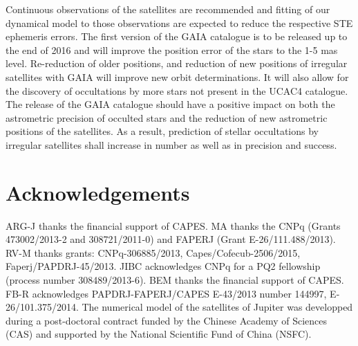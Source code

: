 \documentclass[useAMS,usenatbib]{mn2e}
\begin{document}
Continuous observations of the satellites are recommended and fitting of our dynamical model to those observations are expected to reduce the respective STE ephemeris errors. The first version of the GAIA catalogue is to be released up to the end of 2016 and will improve the position error of the stars to the 1-5 mas level. Re-reduction of older positions, and reduction of new positions of irregular satellites with GAIA will improve new orbit determinations. It will also allow for the discovery of occultations by more stars not present in the UCAC4 catalogue.
The release of the GAIA catalogue should have a positive impact on both the astrometric precision of occulted stars and the reduction of new astrometric positions of the satellites. As a result, prediction of stellar occultations by irregular satellites shall increase in number as well as in precision and success.

\section*{Acknowledgements}

ARG-J thanks the financial support of CAPES.
MA thanks the CNPq (Grants 473002/2013-2 and 308721/2011-0) and FAPERJ (Grant E-26/111.488/2013).
RV-M thanks grants: CNPq-306885/2013, Capes/Cofecub-2506/2015, Faperj/PAPDRJ-45/2013.
JIBC acknowledges CNPq for a PQ2 fellowship (process number 308489/2013-6).
BEM thanks the financial support of CAPES.
FB-R acknowledges PAPDRJ-FAPERJ/CAPES E-43/2013 number 144997, E-26/101.375/2014.
The numerical model of the satellites of Jupiter was developped during a post-doctoral contract funded by the Chinese Academy of Sciences (CAS) and supported by the National Scientific Fund of China (NSFC).






\label{lastpage}
\end{document}
